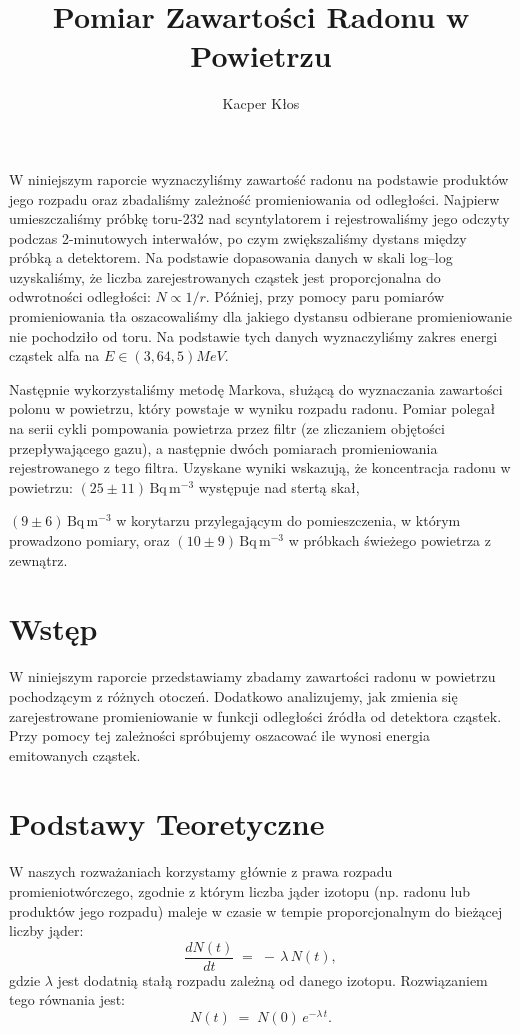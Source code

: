 \documentclass[12pt]{article}
\title{Pomiar Zawartości Radonu w Powietrzu}
\author{Kacper Kłos}
\begin{document}
\maketitle

W niniejszym raporcie wyznaczyliśmy zawartość radonu na podstawie produktów jego rozpadu oraz zbadaliśmy zależność promieniowania od odległości. Najpierw umieszczaliśmy próbkę toru-232 nad scyntylatorem i rejestrowaliśmy jego odczyty podczas 2-minutowych interwałów, po czym zwiększaliśmy dystans między próbką a detektorem. Na podstawie dopasowania danych w skali log–log uzyskaliśmy, że liczba zarejestrowanych cząstek jest proporcjonalna do odwrotności odległości: \(N \propto 1/r\). Później, przy pomocy paru pomiarów promieniowania tła oszacowaliśmy dla jakiego dystansu odbierane promieniowanie nie pochodziło od toru. Na podstawie tych danych wyznaczyliśmy zakres energi cząstek alfa na \(E \in (3{,}6 4{,}5) MeV\).

Następnie wykorzystaliśmy metodę Markova, służącą do wyznaczania zawartości polonu w powietrzu, który powstaje w wyniku rozpadu radonu. Pomiar polegał na serii cykli pompowania powietrza przez filtr (ze zliczaniem objętości przepływającego gazu), a następnie dwóch pomiarach promieniowania rejestrowanego z tego filtra. Uzyskane wyniki wskazują, że koncentracja radonu w powietrzu: \((25 \pm 11)\,\mathrm{Bq\,m^{-3}}\) występuje nad stertą skał, 

\((9 \pm 6)\,\mathrm{Bq\,m^{-3}}\) w korytarzu przylegającym do pomieszczenia, w którym prowadzono pomiary, oraz \((10 \pm 9)\,\mathrm{Bq\,m^{-3}}\) w próbkach świeżego powietrza z zewnątrz.


\newpage

\section{Wstęp}
W niniejszym raporcie przedstawiamy zbadamy zawartości radonu w powietrzu pochodzącym z różnych otoczeń. Dodatkowo analizujemy, jak zmienia się zarejestrowane promieniowanie w funkcji odległości źródła od detektora cząstek. Przy pomocy tej zależności spróbujemy oszacować ile wynosi energia emitowanych cząstek.

\section{Podstawy Teoretyczne}
W naszych rozważaniach korzystamy głównie z prawa rozpadu promieniotwórczego, zgodnie z którym liczba jąder izotopu (np. radonu lub produktów jego rozpadu) maleje w czasie w tempie proporcjonalnym do bieżącej liczby jąder:
\[
\frac{dN(t)}{dt} \;=\; -\,\lambda\,N(t),
\]
gdzie \(\lambda\) jest dodatnią stałą rozpadu zależną od danego izotopu. Rozwiązaniem tego równania jest:
\begin{equation}
	N(t) \;=\; N(0)\,e^{-\lambda\,t}.
	\label{eq:decay}
\end{equation}
\end{document}
